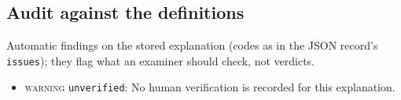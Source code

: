 \begin{drafted}
\subsection{Audit against the definitions}\label{app:churn100-s7-c1:audit}
Automatic findings on the stored explanation (codes as in the JSON record's \texttt{issues}); they flag what an examiner should check, not verdicts.
\begin{itemize}
\item \textsc{warning} \texttt{unverified}: No human verification is recorded for this explanation.
\end{itemize}
\end{drafted}
